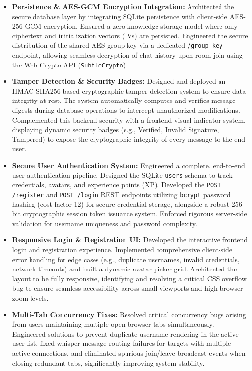 \documentclass[12pt, a4paper]{article}
\begin{document}
\begin{itemize}[leftmargin=*]
    \item \textbf{Persistence \& AES-GCM Encryption Integration:} Architected the secure database layer by integrating SQLite persistence with client-side AES-256-GCM encryption. Ensured a zero-knowledge storage model where only ciphertext and initialization vectors (IVs) are persisted. Engineered the secure distribution of the shared AES group key via a dedicated \texttt{/group-key} endpoint, allowing seamless decryption of chat history upon room join using the Web Crypto API (\texttt{SubtleCrypto}).

    \item \textbf{Tamper Detection \& Security Badges:} Designed and deployed an HMAC-SHA256 based cryptographic tamper detection system to ensure data integrity at rest. The system automatically computes and verifies message digests during database operations to intercept unauthorized modifications. Complemented this backend security with a frontend visual indicator system, displaying dynamic security badges (e.g., Verified, Invalid Signature, Tampered) to expose the cryptographic integrity of every message to the end user.

    \item \textbf{Secure User Authentication System:} Engineered a complete, end-to-end user authentication pipeline. Designed the SQLite \texttt{users} schema to track credentials, avatars, and experience points (XP). Developed the \texttt{POST /register} and \texttt{POST /login} REST endpoints utilizing \texttt{bcrypt} password hashing (cost factor 12) for secure credential storage, alongside a robust 256-bit cryptographic session token issuance system. Enforced rigorous server-side validation for username uniqueness and password complexity.

    \item \textbf{Responsive Login \& Registration UI:} Developed the interactive frontend login and registration experience. Implemented comprehensive client-side error handling for edge cases (e.g., duplicate usernames, invalid credentials, network timeouts) and built a dynamic avatar picker grid. Architected the layout to be fully responsive, identifying and resolving a critical CSS overflow bug to ensure seamless accessibility across small viewports and high browser zoom levels.

    \item \textbf{Multi-Tab Concurrency Fixes:} Resolved critical concurrency bugs arising from users maintaining multiple open browser tabs simultaneously. Engineered solutions to prevent duplicate username rendering in the active user list, fixed whisper message routing failures for targets with multiple active connections, and eliminated spurious join/leave broadcast events when closing redundant tabs, significantly improving system stability.


\end{itemize}
\end{document}
